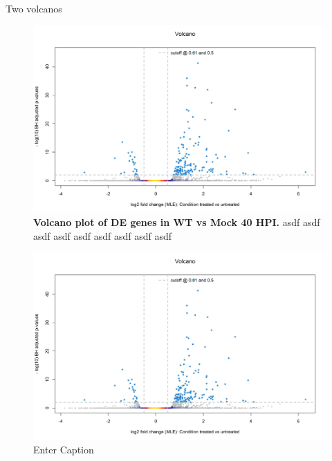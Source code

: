 Two volcanos

\begin{figure}
    \centering
    \includegraphics[width=1\linewidth]{07. Chapter 2//Figs/14. rnaseq volcano.png}
    \caption[Volcano plot of DE genes in WT vs Mock 40 HPI.]{\textbf{Volcano plot of DE genes in WT vs Mock 40 HPI.} asdf asdf asdf asdf asdf asdf asdf asdf asdf }
    \label{Volcano plot of DE genes in WT vs Mock 40 HPI}
\end{figure}

\begin{figure}
    \centering
    \includegraphics[width=1\linewidth]{07. Chapter 2//Figs/14. rnaseq volcano.png}
    \caption{Enter Caption}
    \label{fig:enter-label}
\end{figure}